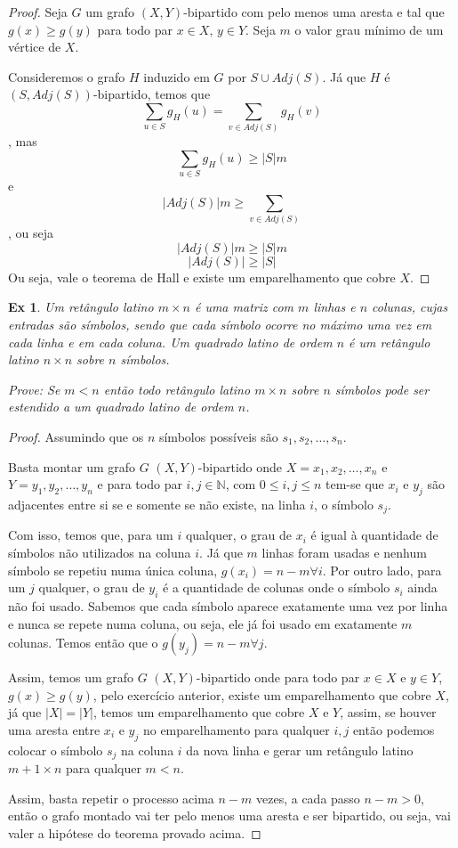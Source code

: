 \documentclass[12pt]{article}
\newcounter{exCounter}
\newtheorem{ex}[exCounter]{Ex}
\begin{document}
\begin{proof}
Seja $G$ um grafo $(X,Y)$-bipartido com pelo menos uma aresta e tal que $g(x) \geq g(y)$ para todo par $x \in X$, $y \in Y$. Seja $m$ o valor grau mínimo de um vértice de $X$.

Consideremos o grafo $H$ induzido em $G$ por $S \cup Adj(S)$. Já que $H$ é $(S,Adj(S))$-bipartido, temos que
$$ \sum_{u \in S} g_H(u) = \sum_{v \in Adj(S)} g_H(v) $$, mas
$$ \sum_{u \in S} g_H(u) \geq |S| m $$ e
$$ |Adj(S)| m \geq \sum_{v \in Adj(S)}$$, ou seja
$$ |Adj(S)| m \geq |S| m $$
$$ |Adj(S)| \geq |S| $$
Ou seja, vale o teorema de Hall e existe um emparelhamento que cobre $X$.
\end{proof}

\begin{ex}
Um retângulo latino $m \times n$ é uma matriz com $m$ linhas e $n$ colunas, cujas entradas são símbolos, sendo que cada símbolo ocorre no máximo uma vez em cada linha e em cada coluna. Um quadrado latino de ordem $n$ é um retângulo latino $n \times n$ sobre $n$ símbolos.

Prove: Se $m < n$ então todo retângulo latino $m \times n$ sobre $n$ símbolos pode ser estendido a um quadrado latino de ordem $n$.
\end{ex}

\begin{proof}
Assumindo que os $n$ símbolos possíveis são $s_1, s_2, \dots, s_n$.

Basta montar um grafo $G$ $(X,Y)$-bipartido onde $X = {x_1, x_2, \dots, x_n}$ e $Y = {y_1, y_2, \dots, y_n}$ e para todo par $i, j \in \mathbb{N}$, com $0 \leq i,j \leq n$ tem-se que $x_i$ e $y_j$ são adjacentes entre si se e somente se não existe, na linha $i$, o símbolo $s_j$.

Com isso, temos que, para um $i$ qualquer, o grau de $x_i$ é igual à quantidade de símbolos não utilizados na coluna $i$. Já que $m$ linhas foram usadas e nenhum símbolo se repetiu numa única coluna, $g(x_i) = n-m \forall i$. Por outro lado, para um $j$ qualquer, o grau de $y_i$ é a quantidade de colunas onde o símbolo $s_i$ ainda não foi usado. Sabemos que cada símbolo aparece exatamente uma vez por linha e nunca se repete numa coluna, ou seja, ele já foi usado em exatamente $m$ colunas. Temos então que o $g(y_j) = n-m \forall j$.

Assim, temos um grafo $G$ $(X,Y)$-bipartido onde para todo par $x \in X$ e $y \in Y$, $g(x) \geq g(y)$, pelo exercício anterior, existe um emparelhamento que cobre $X$, já que $|X| = |Y|$, temos um emparelhamento que cobre $X$ e $Y$, assim, se houver uma aresta entre $x_i$ e $y_j$ no emparelhamento para qualquer $i,j$ então podemos colocar o símbolo $s_j$ na coluna $i$ da nova linha e gerar um retângulo latino $m+1 \times n$ para qualquer $m < n$.

Assim, basta repetir o processo acima $n-m$ vezes, a cada passo $n-m > 0$, então o grafo montado vai ter pelo menos uma aresta e ser bipartido, ou seja, vai valer a hipótese do teorema provado acima.
\end{proof}
\end{document}
